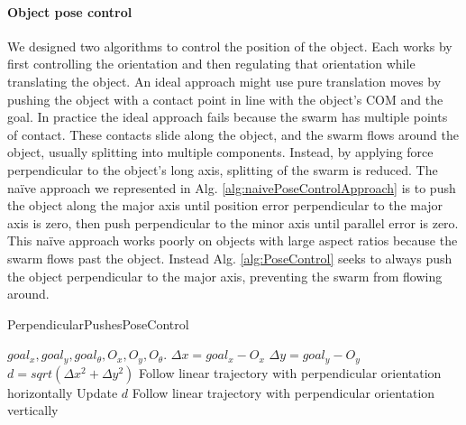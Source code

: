 






\paragraph{Object pose control}
We designed two algorithms to control the position of the object.  
Each works by first controlling the orientation and then regulating that orientation while translating the object. 
An ideal approach might use pure translation moves by  pushing  the object with a contact point in line with the object's COM and the goal.
In practice the ideal approach fails because the swarm has multiple points of contact. These contacts slide along the object, and the swarm flows around the object, usually splitting into multiple components.
Instead, by applying force perpendicular to the object's long axis, splitting of the swarm is reduced. 
The na\"{i}ve approach we represented in Alg. \ref{alg:naivePoseControlApproach} is to push the object along the major axis until position error perpendicular to the major axis is zero, then push perpendicular to the minor axis until parallel error is zero. 
This na\"{i}ve approach works poorly on objects with large aspect ratios because the swarm flows past the object. 
Instead Alg. \ref{alg:PoseControl} seeks to always push the object perpendicular to the major axis, preventing the swarm from flowing around. 


\begin{algorithm}
\caption{PerpendicularPushesPoseControl}\label{alg:naivePoseControlApproach}
\begin{algorithmic}[1]
\Require $goal_x, goal_y, goal_{\theta},O_x, O_y, O_{\theta}$.
\State $\Delta x = goal_x - O_x$
\State $\Delta y = goal_y - O_y$
\State $d = sqrt(\Delta x^2 + \Delta y^2) $ 
\State Follow linear trajectory with perpendicular orientation horizontally 
\State Update $d$
\EndWhile
\State Follow linear trajectory with perpendicular orientation vertically
\end{algorithmic}
\end{algorithm}



